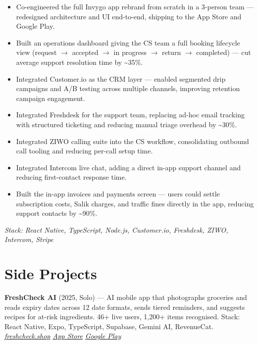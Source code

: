 \documentclass[11pt, letterpaper]{article}
\begin{document}
\begin{itemize}
  \item Co-engineered the full Invygo app rebrand from scratch in a 3-person team — redesigned architecture and UI end-to-end, shipping to the App Store and Google Play.
  \item Built an operations dashboard giving the CS team a full booking lifecycle view (request $\to$ accepted $\to$ in progress $\to$ return $\to$ completed) — cut average support resolution time by \textasciitilde35\%.
  \item Integrated Customer.io as the CRM layer — enabled segmented drip campaigns and A/B testing across multiple channels, improving retention campaign engagement.
  \item Integrated Freshdesk for the support team, replacing ad-hoc email tracking with structured ticketing and reducing manual triage overhead by \textasciitilde30\%.
  \item Integrated ZIWO calling suite into the CS workflow, consolidating outbound call tooling and reducing per-call setup time.
  \item Integrated Intercom live chat, adding a direct in-app support channel and reducing first-contact response time.
  \item Built the in-app invoices and payments screen — users could settle subscription costs, Salik charges, and traffic fines directly in the app, reducing support contacts by \textasciitilde90\%.
\end{itemize}
\textit{Stack: React Native, TypeScript, Node.js, Customer.io, Freshdesk, ZIWO, Intercom, Stripe}

\section{Side Projects}

\textbf{FreshCheck AI} (2025, Solo) — AI mobile app that photographs groceries and reads expiry dates across 12 date formats, sends tiered reminders, and suggests recipes for at-risk ingredients. 46+ live users, 1,200+ items recognised. Stack: React Native, Expo, TypeScript, Supabase, Gemini AI, RevenueCat.\\
\textit{\href{https://www.freshcheck.shop/}{freshcheck.shop} \textbar{} \href{https://apps.apple.com/in/app/freshcheck-ai/id6759404089}{App Store} \textbar{} \href{https://play.google.com/store/apps/details?id=com.alok.freshcheck}{Google Play}}
\end{document}
